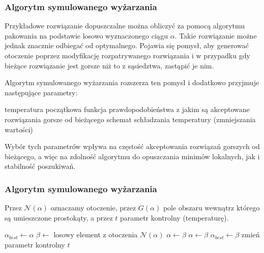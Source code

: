 \documentclass{beamer}
\begin{document}
\begin{frame}
    \frametitle{Algorytm symulowanego wyżarzania}
    Przykładowe rozwiązanie dopuszczalne można obliczyć za pomocą algorytmu pakowania na
    podstawie losowo wyznaczonego ciągu $\alpha.$ Takie rozwiązanie możne jednak znacznie
    odbiegać od optymalnego. Pojawia się pomysł, aby generować otoczenie poprzez modyfikację
    rozpatrywanego rozwiązania i w przypadku gdy bieżące rozwiązanie jest gorsze niż to z
    sąsiedztwa, zastąpić je nim.
    
    Algorytm symulowanego wyżarzania rozszerza ten pomysł i dodatkowo przyjmuje następujące
    parametry:
    \begin{outline}
        \1 temperatura początkowa
        \1 funkcja prawdopodobieństwa z jakim są akceptowane rozwiązania gorsze od bieżącego
        \1 schemat schładzania temperatury (zmniejszania wartości)
    \end{outline}
    Wybór tych parametrów wpływa na częstość akceptowania rozwiązań gorszych od bieżącego,
    a więc na zdolność algorytmu do opuszczania minimów lokalnych, jak i stabilność poszukiwań.
    
\end{frame}

\begin{frame}
    \frametitle{Algorytm symulowanego wyżarzania}
    Przez $\mathcal{N}(\alpha)$ oznaczamy otoczenie, przez $G(\alpha)$ pole obszaru wewnątrz
    którego są umieszczone prostokąty, a przez $t$ parametr kontrolny (temperaturę).
    
    \begin{algorithmic}
        \State $\alpha_{best}\gets\alpha$
        \Repeat
            \Repeat
            \State $\beta\gets$ losowy element z otoczenia $\mathcal{N}(\alpha)$
             $\alpha\gets\beta$
            \Else
                 $\alpha\gets\beta$
                \EndIf
            \EndIf
             $\alpha_{best}\gets\beta$
            \EndIf
            \State zmień parametr kontrolny $t$
    \end{algorithmic}
\end{frame}
\end{document}

